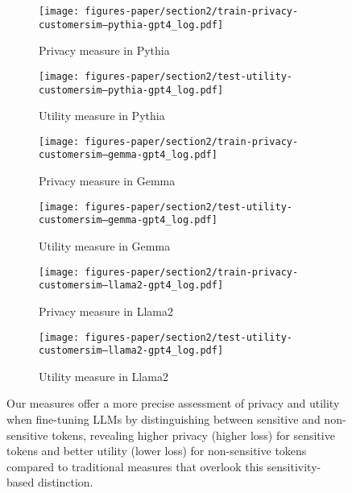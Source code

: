 \begin{figure}[t!]
    \centering
        \begin{subfigure}{.48\linewidth}
       \texttt{[image: figures-paper/section2/train-privacy-customersim--pythia-gpt4\_log.pdf]}
        \caption{Privacy measure in Pythia}
        \label{fig:pyt_priv_log}
    \end{subfigure}
    \hfil
    \begin{subfigure}{.48\linewidth}
        \texttt{[image: figures-paper/section2/test-utility-customersim--pythia-gpt4\_log.pdf]}
        \caption{Utility measure in Pythia}
        \label{fig:pyt_util_log}
    \end{subfigure}
    
    \begin{subfigure}{.48\linewidth}
       \texttt{[image: figures-paper/section2/train-privacy-customersim--gemma-gpt4\_log.pdf]}
        \caption{Privacy measure in Gemma}
        \label{fig:gemma_priv_log}
    \end{subfigure}
    \hfil
    \begin{subfigure}{.48\linewidth}
        \texttt{[image: figures-paper/section2/test-utility-customersim--gemma-gpt4\_log.pdf]}
        \caption{Utility measure in Gemma}
        \label{fig:gemma_util_log}
    \end{subfigure}


    \begin{subfigure}{.48\linewidth}
       \texttt{[image: figures-paper/section2/train-privacy-customersim--llama2-gpt4\_log.pdf]}
        \caption{Privacy measure in Llama2}
        \label{fig:llama_priv_log}
    \end{subfigure}
    \hfil
    \begin{subfigure}{.48\linewidth}
        \texttt{[image: figures-paper/section2/test-utility-customersim--llama2-gpt4\_log.pdf]}
        \caption{Utility measure in Llama2}
        \label{fig:llama_util_log}
    \end{subfigure}
    
    \caption{
    Our measures offer a more precise assessment of privacy and utility when fine-tuning LLMs by distinguishing between sensitive and non-sensitive tokens, revealing higher privacy (higher loss) for sensitive tokens and better utility (lower loss) for non-sensitive tokens compared to traditional measures that overlook this sensitivity-based distinction.
    }
    \label{fig:app_FFT_All_log}
\end{figure}


